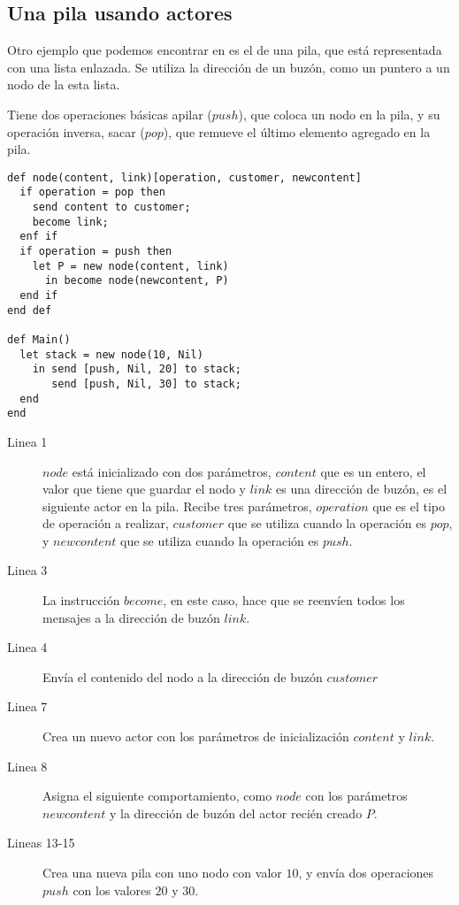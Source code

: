 \subsection{Una pila usando actores}\label{sal:pila}

Otro ejemplo que podemos encontrar en \cite{Agha:1986:AMC:7929} es el de una pila, que está representada con una lista enlazada. Se utiliza la dirección de un buzón, como un puntero a un nodo de la esta lista. 

Tiene dos operaciones básicas apilar ($push$), que coloca un nodo en la pila, y su operación inversa, sacar ($pop$), que remueve el último elemento agregado en la pila.

\begin{lstlisting}[language=sal, style=simple]
def node(content, link)[operation, customer, newcontent]
  if operation = pop then
    send content to customer;
    become link;
  enf if
  if operation = push then
    let P = new node(content, link)
      in become node(newcontent, P)
  end if
end def

def Main() 
  let stack = new node(10, Nil)
    in send [push, Nil, 20] to stack;
       send [push, Nil, 30] to stack;
  end
end
\end{lstlisting}

\begin{description}

\item [Linea 1] $node$ está inicializado con dos parámetros, $content$ que es un entero, el valor que tiene que guardar el nodo y  $link$ es una dirección de buzón, es el siguiente actor en la pila. Recibe tres parámetros, $operation$ que es el tipo de operación a realizar,  $customer$ que se utiliza cuando la operación es $pop$, y $newcontent$ que se utiliza cuando la operación es $push$.
\item [Linea 3] La instrucción $become$, en este caso, hace que se reenvíen todos los mensajes a la dirección de buzón $link$. 
\item [Linea 4] Envía el contenido del nodo a la dirección de buzón $customer$
\item [Linea 7] Crea un nuevo actor con los parámetros de inicialización $content$ y $link$.
\item [Linea 8] Asigna el siguiente comportamiento, como $node$ con los parámetros $newcontent$ y la dirección de buzón del actor recién creado $P$. 
\item [Lineas 13-15] Crea una nueva pila con uno nodo con valor $10$, y envía dos operaciones $push$ con los valores $20$ y $30$.
\end{description}

